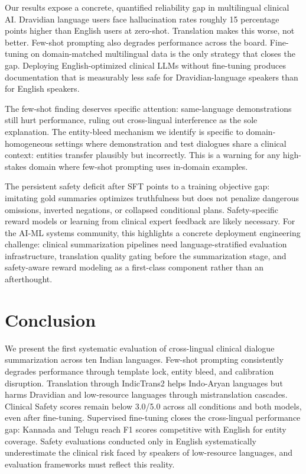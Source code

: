 \documentclass[conference]{IEEEtran}
\begin{document}
Our results expose a concrete, quantified reliability gap in multilingual
clinical AI. Dravidian language users face hallucination rates roughly
15 percentage points higher than English users at zero-shot. Translation
makes this worse, not better. Few-shot prompting also degrades performance
across the board. Fine-tuning on domain-matched multilingual data is the
only strategy that closes the gap. Deploying English-optimized clinical
LLMs without fine-tuning produces documentation that is measurably less
safe for Dravidian-language speakers than for English speakers.

The few-shot finding deserves specific attention: same-language
demonstrations still hurt performance, ruling out cross-lingual
interference as the sole explanation. The entity-bleed mechanism we
identify is specific to domain-homogeneous settings where demonstration
and test dialogues share a clinical context: entities transfer plausibly
but incorrectly. This is a warning for any high-stakes domain where
few-shot prompting uses in-domain examples.

The persistent safety deficit after SFT points to a training objective
gap: imitating gold summaries optimizes truthfulness but does not penalize
dangerous omissions, inverted negations, or collapsed conditional plans.
Safety-specific reward models or learning from clinical expert feedback
are likely necessary. For the AI-ML systems community, this highlights a
concrete deployment engineering challenge: clinical summarization pipelines
need language-stratified evaluation infrastructure, translation quality
gating before the summarization stage, and safety-aware reward modeling as
a first-class component rather than an afterthought.

\section{Conclusion}

We present the first systematic evaluation of cross-lingual clinical
dialogue summarization across ten Indian languages. Few-shot prompting
consistently degrades performance through template lock, entity bleed, and
calibration disruption. Translation through IndicTrans2 helps Indo-Aryan
languages but harms Dravidian and low-resource languages through
mistranslation cascades. Clinical Safety scores remain below 3.0/5.0
across all conditions and both models, even after fine-tuning. Supervised
fine-tuning closes the cross-lingual performance gap: Kannada and Telugu
reach F1 scores competitive with English for entity coverage. Safety
evaluations conducted only in English systematically underestimate the
clinical risk faced by speakers of low-resource languages, and evaluation
frameworks must reflect this reality.



\end{document}
